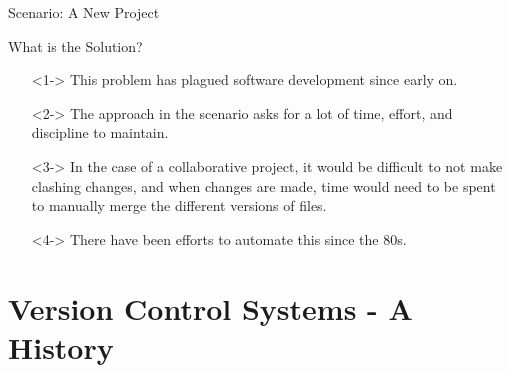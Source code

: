 \documentclass{beamer}
\begin{document}
\begin{frame}{Scenario: A New Project}
  \end{frame}

  \begin{frame}{What is the Solution?}
  \begin{itemize}
    \item[]<1-> This problem has plagued software development since early on. 
      \item[]<2-> The approach in the scenario asks for a lot of time, effort, and discipline to maintain.
      \item[]<3-> In the case of a collaborative project, it would be difficult to not make clashing changes, and when changes are made, time would need to be spent to manually merge the different versions of files.
      \item[]<4-> There have been efforts to automate this since the 80s.
    \end{itemize}
  \end{frame}


\section{Version Control Systems - A History}
\end{document}
